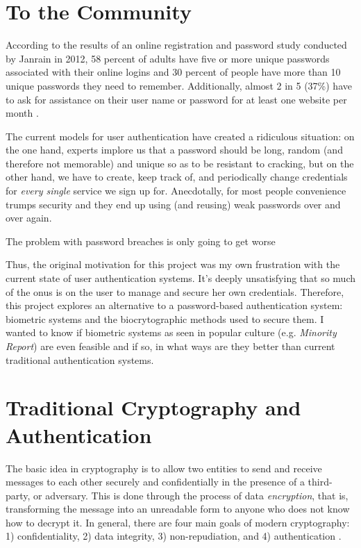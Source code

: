\documentclass[11pt]{article}
\begin{document}
\section{To the Community}
According to the results of an online registration and password study conducted 
by Janrain in 2012, 58 percent of adults have five or more unique 
passwords associated with their online logins and 30 percent of people have 
more than 10 unique passwords they need to remember. Additionally, almost 2 in 
5 (37\%) have to ask for assistance on their user name or password for at least 
one website per month \cite{Janrain12}.

The current models for user authentication have created a ridiculous situation:
on the one hand, experts implore us that a password should be long, random (and 
therefore not memorable) and unique so as to be resistant to cracking, but on
the other hand, we have to create, keep track of, and periodically change 
credentials for \textit{every single} service we sign up for. Anecdotally, for 
most people convenience trumps security and they end up using (and reusing) 
weak passwords over and over again.

    The problem with password breaches is only going to get worse

Thus, the original motivation for this project was my own frustration with the
current state of user authentication systems. It's deeply unsatisfying that so 
much of the onus is on the user to manage and secure her own credentials. Therefore, this project explores an alternative to a password-based 
authentication system: biometric systems and the biocrytographic methods used 
to secure them. I wanted to know if biometric systems as seen in popular 
culture (e.g. \textit{Minority Report}) are even feasible and if so, in what 
ways are they better than current traditional authentication systems.
\section{Traditional Cryptography and Authentication}
The basic idea in cryptography is to allow two entities to send and receive 
messages to each other securely and confidentially in the presence of a 
third-party, or adversary. This is done through the process of data 
\textit{encryption}, that is, transforming the message into an unreadable form 
to anyone who does not know how to decrypt it. In general, there are four 
main goals of modern cryptography: 1) confidentiality, 2) data integrity, 
3) non-repudiation, and 4) authentication \cite{Biocryptography10}.
\end{document}
